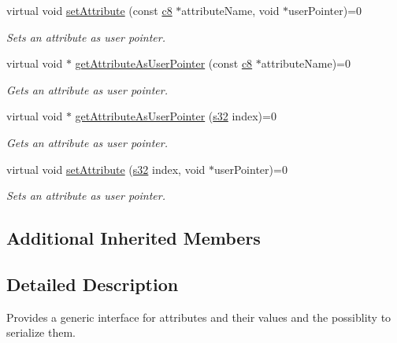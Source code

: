 \begin{DoxyCompactItemize}
virtual void \hyperlink{classirr_1_1io_1_1IAttributes_a558e6bb8c92226e99cd5b858db1b3ea8}{set\+Attribute} (const \hyperlink{namespaceirr_a9395eaea339bcb546b319e9c96bf7410}{c8} $\ast$attribute\+Name, void $\ast$user\+Pointer)=0
\begin{DoxyCompactList}\small\item\em Sets an attribute as user pointer. \end{DoxyCompactList}\item 
virtual void $\ast$ \hyperlink{classirr_1_1io_1_1IAttributes_a6f97e7af81f611bd13ced0378531ed2d}{get\+Attribute\+As\+User\+Pointer} (const \hyperlink{namespaceirr_a9395eaea339bcb546b319e9c96bf7410}{c8} $\ast$attribute\+Name)=0
\begin{DoxyCompactList}\small\item\em Gets an attribute as user pointer. \end{DoxyCompactList}\item 
virtual void $\ast$ \hyperlink{classirr_1_1io_1_1IAttributes_ae720da1bc66bc535ab839e95018d7398}{get\+Attribute\+As\+User\+Pointer} (\hyperlink{namespaceirr_ac66849b7a6ed16e30ebede579f9b47c6}{s32} index)=0
\begin{DoxyCompactList}\small\item\em Gets an attribute as user pointer. \end{DoxyCompactList}\item 
\mbox{\label{classirr_1_1io_1_1IAttributes_aacc6e6d6190d77651c5015ab4a911614}} 
virtual void \hyperlink{classirr_1_1io_1_1IAttributes_aacc6e6d6190d77651c5015ab4a911614}{set\+Attribute} (\hyperlink{namespaceirr_ac66849b7a6ed16e30ebede579f9b47c6}{s32} index, void $\ast$user\+Pointer)=0
\begin{DoxyCompactList}\small\item\em Sets an attribute as user pointer. \end{DoxyCompactList}\end{DoxyCompactItemize}
\subsection*{Additional Inherited Members}


\subsection{Detailed Description}
Provides a generic interface for attributes and their values and the possiblity to serialize them. 

